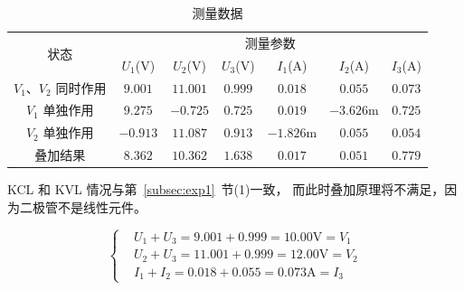 \documentclass[12pt]{SEU-Circuit-Report}
\begin{document}
            \begin{table}[htbp]
                \centering
                \begin{tabular}{ccccccc}
                    \toprule
                    \multirow{2}[4]{*}{状态} & \multicolumn{6}{c}{测量参数} \\
                    \cmidrule{2-7}\multicolumn{1}{c}{} & \multicolumn{1}{c}{$U_1$(V)} & \multicolumn{1}{c}{$U_2$(V)} & \multicolumn{1}{c}{$U_3$(V)} & \multicolumn{1}{c}{$I_1$(A)} & \multicolumn{1}{c}{$I_2$(A)} & \multicolumn{1}{c}{$I_3$(A)} \\
                    \midrule
                    $V_1$、$V_2$ 同时作用 & $9.001$ & $11.001$ & $0.999$ & $0.018$ & $0.055$ & $0.073$ \\
                    $V_1$ 单独作用 & $9.275$ & $-0.725$ & $0.725$ & $0.019$ & $-3.626\mathrm{m}$ & $0.725$ \\
                    $V_2$ 单独作用 & $-0.913$ & $11.087$ & $0.913$ & $-1.826\mathrm{m}$ & $0.055$ & $0.054$ \\
                    叠加结果  & $8.362$ & $10.362$ & $1.638$ & $0.017$ & $0.051$ & $0.779$ \\
                    \bottomrule
                \end{tabular}
                \caption{测量数据\protect\footnotemark}
                \label{tab:2data}
            \end{table}

            \expexpect

            KCL 和 KVL 情况与第~\ref{subsec:exp1}~节(1)一致，
            而此时叠加原理将不满足，因为二极管不是线性元件。

            \emptyline
            \expanalyze

            \begin{equation}\label{eq:kcl_kvl_diode_result}
                \left\{
                    \begin{aligned}
                        & U_1+U_3=9.001+0.999=10.00\mathrm{V}=V_1 \\
                        & U_2+U_3=11.001+0.999=12.00\mathrm{V}=V_2 \\
                        & I_1+I_2=0.018+0.055=0.073\mathrm{A}=I_3
                    \end{aligned}
                \right.
            \end{equation}
\end{document}
